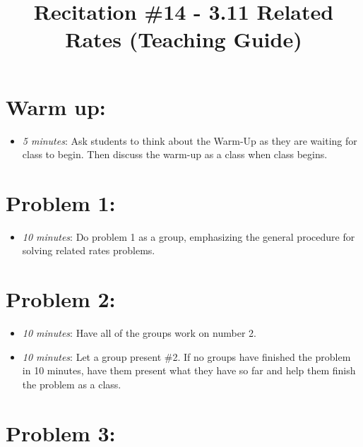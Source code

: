 \documentclass[handout,nooutcomes]{ximera}
\title{Recitation \#14 - 3.11 Related Rates (Teaching Guide)}
\begin{document}
\begin{abstract}		\end{abstract}
\maketitle


\section*{Warm up:} 
	
	\begin{itemize}
	
	\item  \emph{5 minutes}:  Ask students to think about the Warm-Up as they are waiting for class to begin.  Then discuss the warm-up as a class when class begins.
	
	
	
	\end{itemize}


\section*{Problem 1:}

	\begin{itemize}
	
	\item  \emph{10 minutes}:  Do problem 1 as a group, emphasizing the general procedure for solving related rates problems.
	
	\end{itemize}



\section*{Problem 2:}

	\begin{itemize}
	
	\item  \emph{10 minutes}:  Have all of the groups work on number 2.
		
	\item  \emph{10 minutes}:  Let a group present \#2.  If no groups have finished the problem in 10 minutes, have them present what they have so far and help them finish the problem as a class.
			
	\end{itemize}
	
	
	
\section*{Problem 3:}
\end{document}
